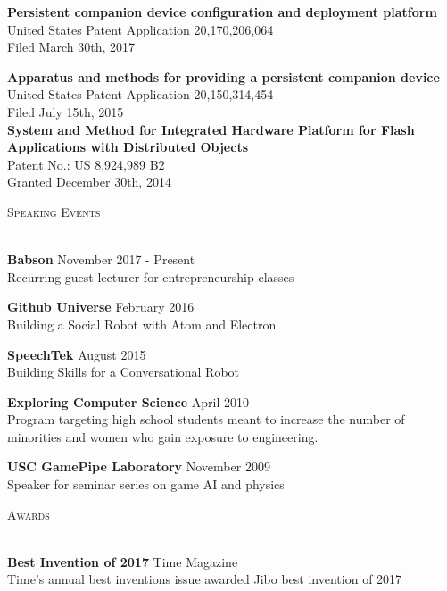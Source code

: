\documentclass[a4paper]{article}
\newcommand{\lineunder} {
    \vspace*{-8pt} \\
    \hspace*{-18pt} \hrulefill \\
}
\newcommand{\header} [1] {
    {\hspace*{-18pt}\vspace*{6pt} \textsc{#1}}
    \vspace*{-6pt} \lineunder
    \vspace{2mm}
}
\begin{document}
\textbf{Persistent companion device configuration and deployment platform}\\
United States Patent Application 20,170,206,064\\
Filed March 30th, 2017
\vspace*{2mm}

\textbf{Apparatus and methods for providing a persistent companion device}\\
United States Patent Application 20,150,314,454\\
Filed July 15th, 2015\\

\vspace*{2mm}
\textbf{System and Method for Integrated Hardware Platform for Flash Applications
with Distributed Objects}\\
Patent No.: US 8,924,989 B2\\
Granted December 30th, 2014 \\
\vspace*{4mm}

\header{Speaking Events}
\textbf{Babson} \hfill November 2017 - Present\\
Recurring guest lecturer for entrepreneurship classes 
\vspace*{2mm}

\textbf{Github Universe} \hfill February 2016\\
Building a Social Robot with Atom and Electron 
\vspace*{2mm}

\textbf{SpeechTek} \hfill August 2015\\
Building Skills for a Conversational Robot 
\vspace*{2mm}

\textbf{Exploring Computer Science} \hfill April 2010\\
Program targeting high school students meant to increase the number of
minorities and women who gain exposure to engineering.
\vspace*{2mm}

\textbf{USC GamePipe Laboratory} \hfill November 2009\\
Speaker for seminar series on game AI and physics 
\vspace*{4mm}

\pagebreak

\header{Awards}

\textbf{Best Invention of 2017} \hfill Time Magazine\\
Time's annual best inventions issue awarded Jibo best invention of 2017
\vspace*{2mm}
\end{document}
